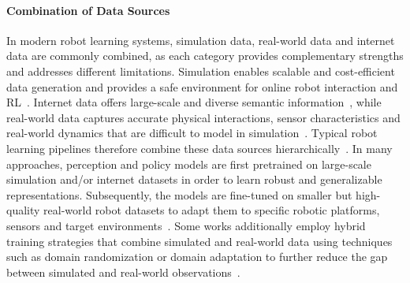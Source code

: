 \paragraph{Combination of Data Sources}
In modern robot learning systems, simulation data, real-world data and internet data are commonly combined, as each category provides complementary strengths and addresses different limitations. 
Simulation enables scalable and cost-efficient data generation and provides a safe environment for online robot interaction and \ac{RL}~\cite{DBLP_journals_corr_abs_1710_06537, DBLP:journals/corr/abs-2009-13303, DBLP_journals_corr_abs_1710_06537, DBLP:journals/corr/abs-2111-00956}. Internet data offers large-scale and diverse semantic information~\cite{open_x_embodiment_rt_x_2023, rt22023arxiv}, while real-world data captures accurate physical interactions, sensor characteristics and real-world dynamics that are difficult to model in simulation~\cite{DBLP:journals/corr/abs-2111-00956}.
Typical robot learning pipelines therefore combine these data sources hierarchically~\cite{rt22023arxiv, nvidia2025gr00tn1openfoundation}. In many approaches, perception and policy models are first pretrained on large-scale simulation and/or internet datasets in order to learn robust and generalizable representations. Subsequently, the models are fine-tuned on smaller but high-quality real-world robot datasets to adapt them to specific robotic platforms, sensors and target environments~\cite{open_x_embodiment_rt_x_2023}. Some works additionally employ hybrid training strategies that combine simulated and real-world data using techniques such as domain randomization or domain adaptation to further reduce the gap between simulated and real-world observations~\cite{Tobin2017DomainRF, DBLP:journals/corr/abs-1812-07252}.







